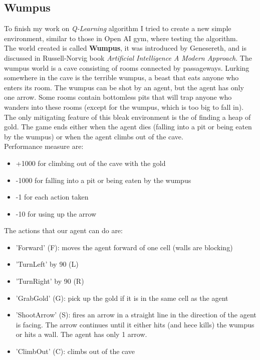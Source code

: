 \documentclass[]{report}
\begin{document}
\vspace{10 mm}

\subsection{Wumpus}
To finish my work on \emph{Q-Learning} algorithm I tried to create a new simple environment, similar to those in Open AI gym, where testing the algorithm.\\
The world created is called \textbf{Wumpus}, it was introduced by Genesereth, and is discussed in Russell-Norvig book \emph{Artificial Intelligence A Modern Approach}.
The wumpus world is a cave consisting of rooms connected by passageways. Lurking somewhere in the cave is the terrible wumpus, a beast that eats anyone who enters its room. The wumpus can be shot by an agent, but the agent has only one arrow. Some rooms contain bottomless pits that will trap anyone who wanders into these rooms (except for the wumpus, which is too big to fall in). The only mitigating feature of this bleak environment is the of finding a heap of gold. The game ends either when the agent dies (falling into a pit or being eaten by the wumpus) or when the agent climbs out of the cave.\\
Performance measure are:
\begin{itemize}
	\item +1000 for climbing out of the cave with the gold
	\item -1000 for falling into a pit or being eaten by the wumpus
	\item -1 for each action taken
	\item -10 for using up the arrow
\end{itemize}

\vspace{7 mm}
The actions that our agent can do are:
\vspace{5 mm}
\begin{itemize}
	\item 'Forward' (F): moves the agent forward of one cell (walls are blocking)
	\item 'TurnLeft' by 90 (L)
	\item 'TurnRight' by 90 (R)
	\item 'GrabGold' (G): pick up the gold if it is in the same cell as the agent
	\item 'ShootArrow' (S): fires an arrow in a straight line in the direction of the agent is facing. The arrow continues until it either hits (and hece kills) the wumpus or hits a wall. The agent has only 1 arrow.
	\item 'ClimbOut' (C): climbs out of the cave	   
\end{itemize}
\end{document}

